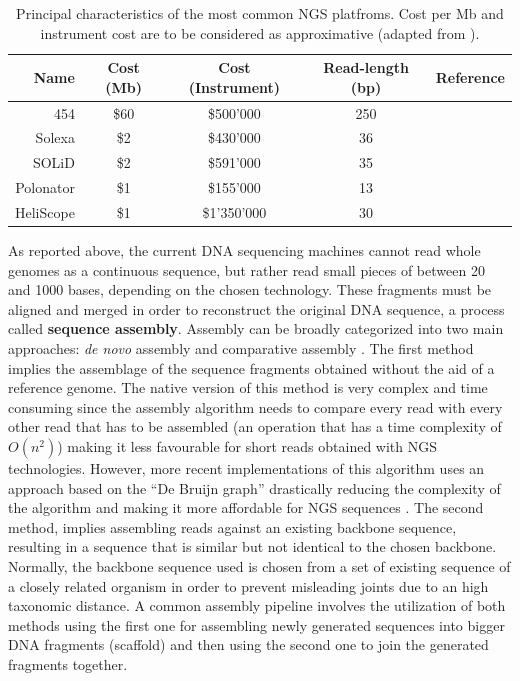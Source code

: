 \begin{table}
\centering
\scriptsize
\begin{tabular}{ r c c c c }
\hline
\textbf{Name} & \textbf{Cost (Mb)} & \textbf{Cost (Instrument)} & \textbf{Read-length (bp)} & \textbf{Reference} \\ \hline \hline
454 & \$60 & \$500'000 & 250 & \cite{margulies2005genome, dressman2003transforming} \\
Solexa & \$2 & \$430'000 & 36 & \cite{bentley2006whole, fedurco2006bta} \\
SOLiD & \$2 & \$591'000 & 35 & \cite{shendure2005accurate, mckernan2013reagents} \\
Polonator & \$1 & \$155'000 & 13 & \cite{shendure2005accurate, dressman2003transforming} \\
HeliScope & \$1 & \$1'350'000 & 30 & \cite{harris2008single, braslavsky2003sequence} \\
\hline
\end{tabular}
\caption{Principal characteristics of the most common NGS platfroms. Cost per Mb and instrument cost are to be considered as approximative (adapted from \cite{shendure2008next}). \label{tab:ngs}}
\end{table}
As reported above, the current DNA sequencing machines cannot read whole genomes as a continuous sequence, but rather read small pieces of between 20 and 1000 bases, depending on the chosen technology. These fragments must be aligned and merged in order to reconstruct the original DNA sequence, a process called \textbf{sequence assembly}. Assembly can be broadly categorized into two main approaches: \textit{de novo} assembly and comparative assembly \cite{pop2009genome}. The first method implies the assemblage of the sequence fragments obtained without the aid of a reference genome. The native version of this method is very complex and time consuming since the assembly algorithm needs to compare every read with every other read that has to be assembled (an operation that has a time complexity of $O\left(n^2\right)$) making it less favourable for short reads obtained with NGS technologies. However, more recent implementations of this algorithm uses an approach based on the ``De Bruijn graph'' drastically reducing the complexity of the algorithm and making it more affordable for NGS sequences \cite{compeau2011apply}. The second method, implies assembling reads against an existing backbone sequence, resulting in a sequence that is similar but not identical to the chosen backbone. Normally, the backbone sequence used is chosen from a set of existing sequence of a closely related organism in order to prevent misleading joints due to an high taxonomic distance. A common assembly pipeline involves the utilization of both methods using the first one for assembling newly generated sequences into bigger DNA fragments (scaffold) and then using the second one to join the generated fragments together.\\
